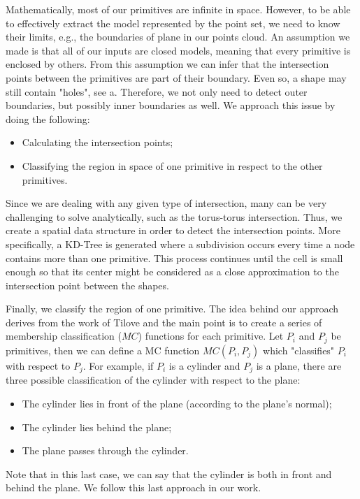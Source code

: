 \documentclass[10pt, conference]{IEEEtran}
\begin{document}
Mathematically, most of our primitives are infinite in space. However, to be able to effectively extract the model represented by the point set, we need to know their limits, e.g., the boundaries of plane in our points cloud. An assumption we made is that all of our inputs are closed models, meaning that every primitive is enclosed by others. From this assumption we can infer that the intersection points between the primitives are part of their boundary. Even so, a shape may still contain "holes", see a. Therefore, we not only need to detect outer boundaries, but possibly inner boundaries as well. We approach this issue by doing the following:
\begin{itemize}
	\item Calculating the intersection points;
	\item Classifying the region in space of one primitive in respect to the other primitives.
\end{itemize}

Since we are dealing with any given type of intersection, many can be very challenging to solve analytically, such as the torus-torus intersection. Thus, we create a spatial data structure in order to detect the intersection points. More specifically, a KD-Tree is generated where a subdivision occurs every time a node contains more than one primitive. This process continues until the cell is small enough so that its center might be considered as a close approximation to the intersection point between the shapes.

Finally, we classify the region of one primitive. The idea behind our approach derives from the work of Tilove \cite{tilove77} and the main point is to create a series of membership classification ($MC$) functions for each primitive. Let $P_i$ and $P_j$ be primitives, then we can define a MC function $MC(P_i, P_j)$ which "classifies" $P_i$ with respect to $P_j$. For example, if $P_i$ is a cylinder and $P_j$ is a plane, there are three possible classification of the cylinder with respect to the plane:
\begin{itemize}
	\item The cylinder lies in front of the plane (according to the plane's normal);
	\item The cylinder lies behind the plane;
	\item The plane passes through the cylinder.
\end{itemize}

Note that in this last case, we can say that the cylinder is both in front and behind the plane. We follow this last approach in our work.
\end{document}
